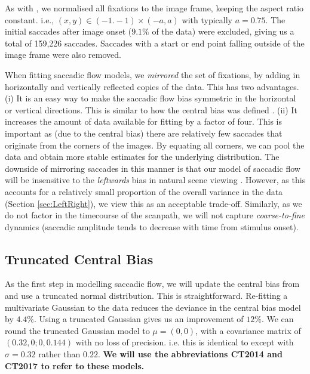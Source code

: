 \documentclass[a4paper, twocolumn, oneside, 11pt]{article}
\begin{document}
As with \cite{clarke-tatler2014}, we normalised all fixations to the image frame, keeping the aspect ratio constant. i.e., $(x,y)\in (-1.-1)\times(-a,a)$ with typically $a=0.75$. The initial saccades after image onset ($9.1\%$ of the data) were excluded, giving us a total of 159,226 saccades. Saccades with a start or end point falling outside of the image frame were also removed. 

When fitting saccadic flow models, we \textit{mirrored} the set of fixations, by adding in horizontally and vertically reflected copies of the data. This has two advantages. (i) It is an easy way to make the saccadic flow bias symmetric in the horizontal or vertical directions. This is similar to how the central bias was defined \cite{clarke-tatler2014}. (ii) It increases the amount of data available for fitting by a factor of four. This is important as (due to the central bias) there are relatively few saccades that originate from the corners of the images. By equating all corners, we can pool the data and obtain more stable estimates for the underlying distribution. The downside of mirroring saccades in this manner is that our model of saccadic flow will be insensitive to the \textit{leftwards} bias in natural scene viewing \citep{nuthmann-matthias2014}. However, as this accounts for a relatively small proportion of the overall variance in the data (Section \ref{sec:LeftRight}), we view this as an acceptable trade-off. Similarly, as we do not factor in the timecourse of the scanpath, we will not capture \textit{coarse-to-fine} dynamics (saccadic amplitude tends to decrease with time from stimulus onset).


\subsection{Truncated Central Bias}
\label{sec:truncatedCentral}

As the first step in modelling saccadic flow, we will update the central bias from \cite{clarke-tatler2014} and use a truncated normal distribution. This is straightforward. Re-fitting a multivariate Gaussian to the data reduces the deviance in the central bias model by $4.4\%$. Using a truncated Gaussian gives us an improvement of $12\%$. We can round the truncated Gaussian model to $\mu = (0,0)$, with a covariance matrix of $(0.32, 0; 0, 0.144)$ with no loss of precision. i.e. this is identical to \cite{clarke-tatler2014} except with $\sigma=0.32$ rather than $0.22$. \textbf{We will use the abbreviations CT2014 and CT2017 to refer to these models.}
\end{document}
